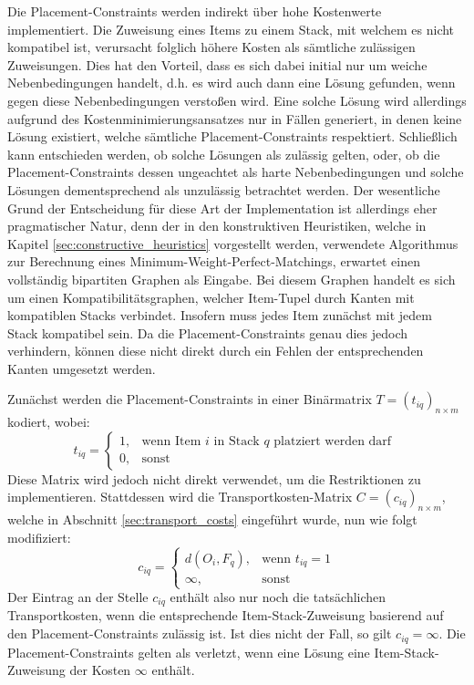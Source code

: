 Die Placement-Constraints werden indirekt über hohe Kostenwerte implementiert. Die Zuweisung eines Items zu einem
Stack, mit welchem es nicht kompatibel ist, verursacht folglich höhere Kosten als sämtliche zulässigen Zuweisungen.
Dies hat den Vorteil, dass es sich dabei initial nur um weiche Nebenbedingungen handelt,
d.h. es wird auch dann eine Lösung gefunden, wenn gegen diese Nebenbedingungen verstoßen wird.
Eine solche Lösung wird allerdings aufgrund des Kostenminimierungsansatzes nur in Fällen generiert,
in denen keine Lösung existiert, welche sämtliche Placement-Constraints respektiert.
Schließlich kann entschieden werden, ob solche Lösungen als zulässig gelten,
oder, ob die Placement-Constraints dessen ungeachtet als harte Nebenbedingungen und solche
Lösungen dementsprechend als unzulässig betrachtet werden.
Der wesentliche Grund der Entscheidung für diese Art der Implementation ist allerdings eher pragmatischer Natur, denn der in den konstruktiven Heuristiken, welche in Kapitel \ref{sec:constructive_heuristics} vorgestellt werden, verwendete Algorithmus zur Berechnung eines Minimum-Weight-Perfect-Matchings, erwartet einen vollständig bipartiten Graphen als Eingabe. Bei diesem Graphen handelt es sich um einen Kompatibilitätsgraphen, welcher Item-Tupel durch Kanten mit kompatiblen Stacks verbindet. Insofern muss jedes Item zunächst mit jedem Stack kompatibel sein. Da die Placement-Constraints genau dies jedoch verhindern, können diese nicht direkt durch ein Fehlen der entsprechenden Kanten umgesetzt werden.

\vfill
\pagebreak

Zunächst werden die Placement-Constraints in einer Binärmatrix $T = (t_{iq})_{n \times m}$ kodiert, wobei:
\[
    t_{iq} =
\begin{cases}
    1, & \text{wenn Item $i$ in Stack $q$ platziert werden darf }\\
    0, & \text{sonst}
\end{cases}
\]
Diese Matrix wird jedoch nicht direkt verwendet, um die Restriktionen zu implementieren. Stattdessen wird
die Transportkosten-Matrix $C = (c_{iq})_{n \times m}$, welche in Abschnitt \ref{sec:transport_costs} eingeführt wurde, nun wie folgt modifiziert:
\[
    c_{iq} =
\begin{cases}
    d(O_i, F_q), & \text{wenn $t_{iq} = 1$}\\
    \infty, & \text{sonst}
\end{cases}
\]
Der Eintrag an der Stelle $c_{iq}$ enthält also nur noch die tatsächlichen Transportkosten, wenn die
entsprechende Item-Stack-Zuweisung basierend auf den Placement-Constraints zulässig ist.
Ist dies nicht der Fall, so gilt $c_{iq} = \infty$.
Die Placement-Constraints gelten als verletzt, wenn eine Lösung eine Item-Stack-Zuweisung
der Kosten $\infty$ enthält.

